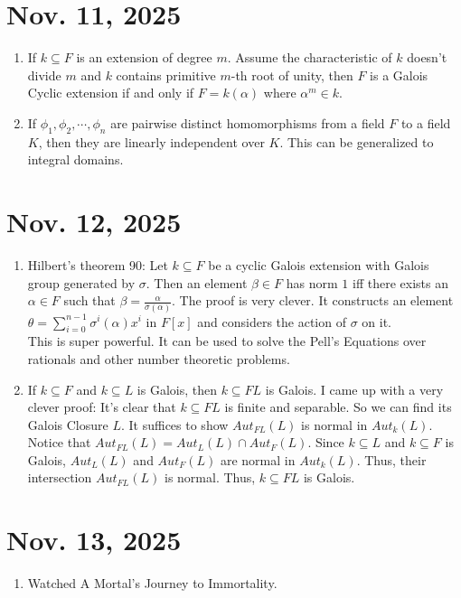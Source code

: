 \documentclass[15pt]{scrartcl}
\begin{document}
\section{Nov. 11, 2025}
\begin{enumerate}
\item If $k\subseteq F$ is an extension of degree $m$. Assume the characteristic of $k$ doesn't divide $m$ and $k$ contains primitive $m$-th root of unity, 
then $F$ is a Galois Cyclic extension if and only if $F=k(\alpha)$ where $\alpha^m\in k$. 
\item If $\phi_1, \phi_2, \cdots, \phi_n$ are pairwise distinct homomorphisms from a field $F$ to a field $K$, then they are linearly independent over $K$. This can be generalized to integral domains. 
\end{enumerate}
\section{Nov. 12, 2025}
\begin{enumerate}
\item Hilbert's theorem 90: Let $k\subseteq F$ be a cyclic Galois extension with Galois group generated by $\sigma$. 
Then an element $\beta\in F$ has norm $1$ iff there exists an $\alpha\in F$ such that $\beta=\frac{\alpha}{\sigma(\alpha)}$. The proof is very clever. It constructs an element $\theta=\sum_{i=0}^{n-1} \sigma^i(\alpha)x^i$ in $F[x]$ and considers the action of $\sigma$ on it.
\\
This is super powerful. It can be used to solve the Pell's Equations over rationals and other number theoretic problems. 
\item If $k\subseteq F$ and $k\subseteq L$ is Galois, then $k\subseteq FL$ is Galois. I came up with a very clever proof: 
It's clear that $k\subseteq FL$  is finite and separable. 
So we can find its Galois Closure $L$. 
It suffices to show $Aut_{FL}(L)$ is normal in $Aut_k(L)$. 
Notice that $Aut_{FL}(L)=Aut_L(L)\cap Aut_F(L)$. 
Since $k\subseteq L$ and $k\subseteq F$ is Galois, 
$Aut_L(L)$ and $Aut_F(L)$ are normal in $Aut_k(L)$. 
Thus, their intersection $Aut_{FL}(L)$ is normal. 
Thus, $k\subseteq FL$ is Galois.
\end{enumerate}
\section{Nov. 13, 2025}
\begin{enumerate}
\item Watched A Mortal's Journey to Immortality. 
\end{enumerate}
\end{document}

